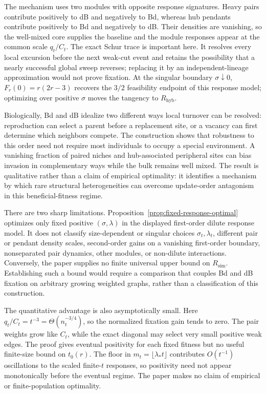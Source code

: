 \documentclass[11pt]{article}
\theoremstyle{definition}
\theoremstyle{remark}
\newcommand{\Rsim}{R_{\mathrm{sim}}}
\newcommand{\Rhyb}{R_{\mathrm{hyb}}}
\begin{document}
The mechanism uses two modules with opposite response signatures.  Heavy
pairs contribute positively to dB and negatively to Bd, whereas hub
pendants contribute positively to Bd and negatively to dB.  Their densities
are vanishing, so the well-mixed core supplies the baseline and the module
responses appear at the common scale $q_t/C_t$.  The exact Schur trace is
important here.  It resolves every local excursion before the next weak-cut
event and retains the possibility that a nearly successful global sweep
reverses; replacing it by an independent-lineage approximation would not
prove fixation.
At the singular boundary $\sigma\downarrow0$,
$F_r(0)=r(2r-3)$ recovers the $3/2$ feasibility endpoint of this response
model; optimizing over positive $\sigma$ moves the tangency to $\Rhyb$.

Biologically, Bd and dB idealize two different ways local turnover can be
resolved: reproduction can select a parent before a replacement site, or a
vacancy can first determine which neighbors compete.  The construction
shows that robustness to this order need not require most individuals to
occupy a special environment.  A vanishing fraction of paired niches and
hub-associated peripheral sites can bias invasion in complementary ways
while the bulk remains well mixed.  The result is qualitative rather than a
claim of empirical optimality: it identifies a mechanism by which rare
structural heterogeneities can overcome update-order antagonism in this
beneficial-fitness regime.

There are two sharp limitations.  Proposition~\ref{prop:fixed-response-optimal}
optimizes only fixed positive $(\sigma,\lambda)$ in the displayed
first-order dilute response model.  It does not classify size-dependent or
singular choices $\sigma_t,\lambda_t$, different pair or pendant density
scales, second-order gains on a vanishing first-order boundary, nonseparated
pair dynamics, other modules, or non-dilute interactions.  Conversely, the
paper supplies no finite universal upper bound on $\Rsim$.  Establishing
such a bound would require a comparison that couples Bd and dB fixation on
arbitrary growing weighted graphs, rather than a classification of this
construction.

The quantitative advantage is also asymptotically small.  Here
$q_t/C_t=t^{-3}=\Theta(n_t^{-3/4})$, so the normalized fixation gain tends to
zero.  The pair weights grow like $C_t$, while the exact diagonal may select
very small positive weak edges.  The proof gives eventual positivity for
each fixed fitness but no useful finite-size bound on $t_0(r)$.  The floor in
$m_t=\lfloor\lambda_*t\rfloor$ contributes $O(t^{-1})$ oscillations to the
scaled finite-$t$ responses, so positivity need not appear monotonically
before the eventual regime.  The paper makes no claim of empirical or
finite-population optimality.
\end{document}
